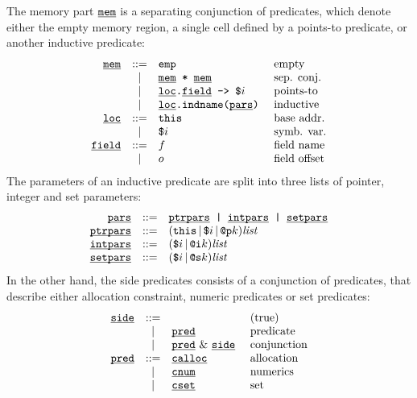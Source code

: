 The memory part \( \underline{\smash{\texttt{mem}}} \) is a separating conjunction of predicates,
which denote either the empty memory region, a single cell defined by
a points-to predicate, or another inductive predicate:
\[
\begin{array}{rcll}
  \underline{\smash{\texttt{mem}}}
  & ::=
  & \texttt{emp}
  & \text{ empty}
  \\
  & |
  & \underline{\smash{\texttt{mem}}} \texttt{ * } \underline{\smash{\texttt{mem}}}
  & \text{ sep. conj.}
  \\
  & |
  & \underline{\smash{\texttt{loc}}} \texttt{.} \underline{\smash{\texttt{field}}} \texttt{ -> } \texttt{\$}i
  & \text{ points-to}
  \\
  & |
  & \underline{\smash{\texttt{loc}}} \texttt{.} \texttt{indname} \texttt{(} \underline{\smash{\texttt{pars}}} \texttt{)}
  & \text{ inductive}
  \\
  \underline{\smash{\texttt{loc}}}
  & ::=
  & \texttt{this}
  & \text{ base addr.}
  \\
  & |
  & \texttt{\$}i
  & \text{ symb. var.}
  \\
  \underline{\smash{\texttt{field}}}
  & ::=
  & f
  & \text{ field name}
  \\
  & |
  & o
  & \text{ field offset}
\end{array}
\]
The parameters of an inductive predicate are split into three lists of
pointer, integer and set parameters:
\[
\begin{array}{rcl}
  \underline{\smash{\texttt{pars}}}
  & ::=
  & \underline{\smash{\texttt{ptrpars}}} \texttt{ | } \underline{\smash{\texttt{intpars}}} \texttt{ | } \underline{\smash{\texttt{setpars}}}
  \\
  \underline{\smash{\texttt{ptrpars}}}
  & ::=
  & (\texttt{this} \, | \, \texttt{\$}i \, | \, \texttt{@p}k) \textit{list}
  \\
  \underline{\smash{\texttt{intpars}}}
  & ::=
  & (\texttt{\$}i \, | \, \texttt{@i}k) \textit{list}
  \\
  \underline{\smash{\texttt{setpars}}}
  & ::=
  & (\texttt{\$}i \, | \, \texttt{@s}k) \textit{list}
  \\
\end{array}
\]
In the other hand, the side predicates consists of a conjunction
of predicates, that describe either allocation constraint, numeric
predicates or set predicates:
\[
\begin{array}{rcll}
  \underline{\smash{\texttt{side}}}
  & ::=
  & 
  & \text{ (true)}
  \\
  & |
  & \underline{\smash{\texttt{pred}}}
  & \text{ predicate}
  \\
  & |
  & \underline{\smash{\texttt{pred}}} \text{ \& } \underline{\smash{\texttt{side}}}
  & \text{ conjunction}
  \\
  \underline{\smash{\texttt{pred}}}
  & ::=
  & \underline{\smash{\texttt{calloc}}}
  & \text{ allocation}
  \\
  & |
  & \underline{\smash{\texttt{cnum}}}
  & \text{ numerics}
  \\
  & |
  & \underline{\smash{\texttt{cset}}}
  & \text{ set}
  \\
\end{array}
\]
